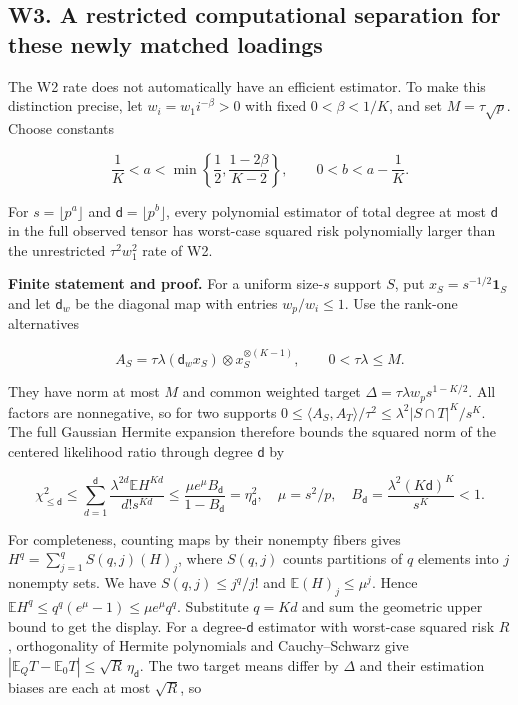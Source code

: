 \subsection{W3. A restricted computational separation for these newly
matched
loadings}\label{w3.-a-restricted-computational-separation-for-these-newly-matched-loadings}\label{sup:W3}

The W2 rate does not automatically have an efficient estimator. To make
this distinction precise, let \(w_i=w_1i^{-\beta}>0\) with fixed
\(0<\beta<1/K\), and set \(M=\tau\sqrt p\). Choose constants

\[\frac1K<a<\min\left\{\frac12,\frac{1-2\beta}{K-2}\right\},
\qquad 0<b<a-\frac1K.\]

For \(s=\lfloor p^a\rfloor\) and \(\mathsf d=\lfloor p^b\rfloor\), every
polynomial estimator of total degree at most \(\mathsf d\) in the full
observed tensor has worst-case squared risk polynomially larger than the
unrestricted \(\tau^2w_1^2\) rate of W2.

\textbf{Finite statement and proof.} For a uniform size-\(s\) support
\(S\), put \(x_S=s^{-1/2}\mathbf1_S\) and let \(\mathsf d_w\) be the
diagonal map with entries \(w_p/w_i\le1\). Use the rank-one alternatives

\[A_S=\tau\lambda(\mathsf d_wx_S)\otimes x_S^{\otimes(K-1)},\qquad
0<\tau\lambda\le M.\]

They have norm at most \(M\) and common weighted target
\(\Delta=\tau\lambda w_p s^{1-K/2}\). All factors are nonnegative, so
for two supports \(0\le\langle A_S,A_T\rangle/\tau^2\le
\lambda^2|S\cap T|^K/s^K\). The full Gaussian Hermite expansion
therefore bounds the squared norm of the centered likelihood ratio
through degree \(\mathsf d\) by

\[\chi^2_{\le \mathsf d}\le\sum_{d=1}^{\mathsf d}
\frac{\lambda^{2d}\mathbb E H^{Kd}}{d!s^{Kd}}
\le\frac{\mu e^\mu B_{\mathsf d}}{1-B_{\mathsf d}}=\eta_{\mathsf d}^2,
\quad \mu=s^2/p,\quad B_{\mathsf d}=\frac{\lambda^2(K\mathsf d)^K}{s^K}<1.\]

For completeness, counting maps by their nonempty fibers gives
\(H^q=\sum_{j=1}^q S(q,j)(H)_j\), where \(S(q,j)\) counts partitions of
\(q\) elements into \(j\) nonempty sets. We have \(S(q,j)\le j^q/j!\)
and \(\mathbb E(H)_j\le\mu^j\). Hence
\(\mathbb E H^q\le q^q(e^\mu-1)\le\mu e^\mu q^q\). Substitute \(q=Kd\)
and sum the geometric upper bound to get the display. For a
degree-\(\mathsf d\) estimator with worst-case squared risk \(R\),
orthogonality of Hermite polynomials and Cauchy--Schwarz give
\(|\mathbb E_QT-\mathbb E_0T|\le\sqrt R\,\eta_{\mathsf d}\). The two
target means differ by \(\Delta\) and their estimation biases are each
at most \(\sqrt R\), so

